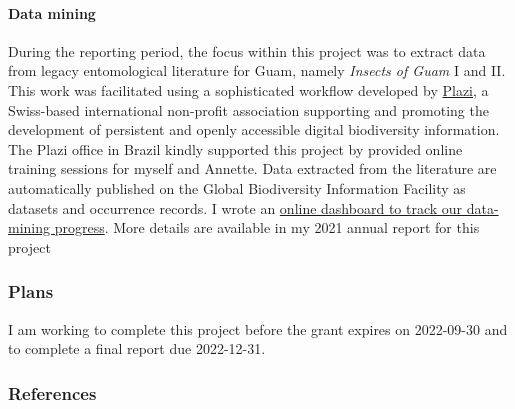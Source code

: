 \begin{refsection}
	\paragraph{Data mining} During the reporting period, the focus within this project was to extract data from legacy entomological literature for Guam, namely \textit{Insects of Guam} I and II. This work was facilitated using a sophisticated workflow developed by \href{https://en.wikipedia.org/wiki/Plazi}{Plazi}, a Swiss-based international non-profit association supporting and promoting the development of persistent and openly accessible digital biodiversity information. The Plazi office in Brazil kindly supported this project by provided online training sessions for myself and Annette. Data extracted from the literature are automatically published on the Global Biodiversity Information Facility as datasets and occurrence records. I wrote an \href{https://aubreymoore.github.io/data-mining-insects-of-guam/MatCit-Validator/status_report.html}{online dashboard to track our data-mining progress}. More details are available in my 2021 annual report for this project \cite{moore_guam_2021}
	
	\subsubsection{Plans}
	
	I am working to complete this project before the grant expires on 2022-09-30 and to complete a final report due 2022-12-31.
	
	\subsubsection{References}
	\printbibliography[heading=none]
\end{refsection}

